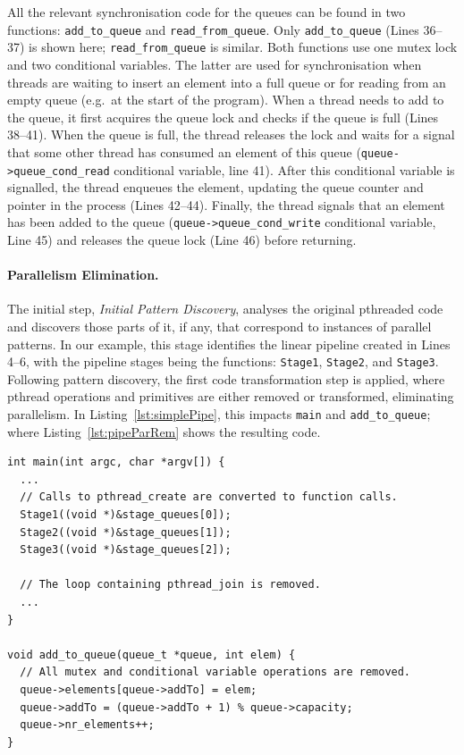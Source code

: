 All the relevant synchronisation code for the queues can be found in two functions: \lstinline{add_to_queue} and \lstinline{read_from_queue}. Only \lstinline{add_to_queue} (Lines 36--37) is shown here; \lstinline{read_from_queue} is similar. Both functions use one mutex lock and two conditional variables. The latter are used for synchronisation when threads are waiting to insert an element into a full queue or for reading from an empty queue (e.g.\ at the start of the program). When a thread needs to add to the queue, it first acquires the queue lock and checks if the queue is full (Lines 38--41).
When the queue is full, the thread releases the lock and waits for a signal that some other thread has consumed an element of this queue (\lstinline{queue->queue_cond_read} conditional variable, line 41). After this conditional variable is signalled, the thread enqueues the element, updating the queue counter and pointer in the process (Lines 42--44). Finally, the thread signals that an element has been added to the queue (\lstinline{queue->queue_cond_write} conditional variable, Line 45) and releases the queue lock (Line 46) before returning.

\paragraph{Parallelism Elimination.}
The initial step, \emph{Initial Pattern Discovery}, analyses the original pthreaded code and discovers those parts of it, if any, that correspond to instances of parallel patterns. In our example, this stage identifies the linear pipeline created in Lines 4--6, with the pipeline stages being the functions: \lstinline{Stage1}, \lstinline{Stage2}, and \lstinline{Stage3}. 
Following pattern discovery, the first code transformation step is applied, where pthread operations and primitives are either removed or transformed, eliminating parallelism.
In Listing~\ref{lst:simplePipe}, this impacts \lstinline|main| and \lstinline|add_to_queue|; where Listing~\ref{lst:pipeParRem} shows the resulting code.

\begin{lstlisting}[caption=Simple Pipeline Code with Parallelism Removed, frame=single, label=lst:pipeParRem]
int main(int argc, char *argv[]) {
  ...
  // Calls to pthread_create are converted to function calls.
  Stage1((void *)&stage_queues[0]);
  Stage2((void *)&stage_queues[1]);
  Stage3((void *)&stage_queues[2]);
  
  // The loop containing pthread_join is removed.
  ...
}

void add_to_queue(queue_t *queue, int elem) {
  // All mutex and conditional variable operations are removed.
  queue->elements[queue->addTo] = elem;
  queue->addTo = (queue->addTo + 1) % queue->capacity;
  queue->nr_elements++;
}
\end{lstlisting}

